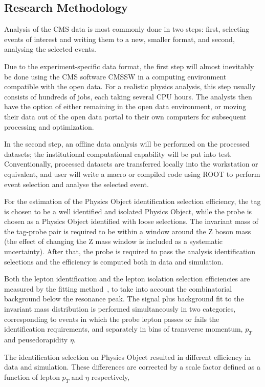 \documentclass[]{article}
\begin{document}
\subsection{Research Methodology}

Analysis of the CMS data is most commonly done in two steps: first, selecting events of interest and writing them to a new, smaller format, and second, analysing the selected events.

Due to the experiment-specific data format, the first step will almost inevitably be done using the CMS software CMSSW in a computing environment compatible with the open data. For a realistic physics analysis, this step usually consists of hundreds of jobs, each taking several CPU hours. The analysts then have the option of either remaining in the open data environment, or moving their data out of the open data portal to their own computers for subsequent processing and optimization.

In the second step, an offline data analysis will be performed on the processed datasets; the institutional computational capability will be put into test. Conventionally, processed datasets are transferred locally into the workstation or equivalent, and user will write a macro or compiled code using ROOT to perform event selection and analyse the selected event.

For the estimation of the Physics Object identification selection efficiency, the tag is chosen to be
a well identified and isolated Physics Object, while the probe is chosen as a Physics Object identified with loose selections. The invariant mass of the tag-probe pair is required to be within a window around the Z boson mass (the effect of changing the Z mass window is included as a systematic uncertainty). After that, the probe is required to pass the analysis identification selections and the efficiency is computed both in data and simulation.

Both the lepton identification and the lepton isolation selection efficiencies are measured by the fitting method~\cite{Behnke:1517556}, to take into account the combinatorial background below the resonance peak. The signal plus background fit to the invariant mass distribution is performed simultaneously in two categories, corresponding to events in which the probe lepton passes or fails the
identification requirements, and separately in bins of transverse momentum, $p_{T}$ and peusedorapidity $\eta$.

The identification selection on Physics Object resulted in different efficiency in data and simulation. These differences are corrected by a scale factor defined as a function of lepton $p_{T}$ and $\eta$ respectively,
\end{document}
